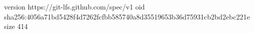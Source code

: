version https://git-lfs.github.com/spec/v1
oid sha256:4056a71bd5428f4d7262fcfbb585740a8d35519653b36d75931cb2bd2ebc221e
size 414

